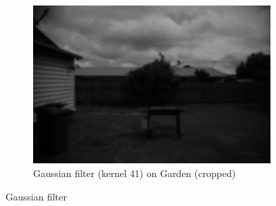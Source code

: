 \documentclass{article}
\begin{document}
\begin{figure}[H]
\begin{subfigure}{0.3\textwidth}
		\includegraphics[trim={20cm 25cm 25cm 10cm},clip,width=\textwidth]{Generated/Garden_gaussian41filter.png}
		\caption{Gaussian filter (kernel 41) on Garden (cropped)}
		\label{fig:gaussian41_Garden}
	\end{subfigure}
	\caption{Gaussian filter}
\end{figure}
\end{document}
